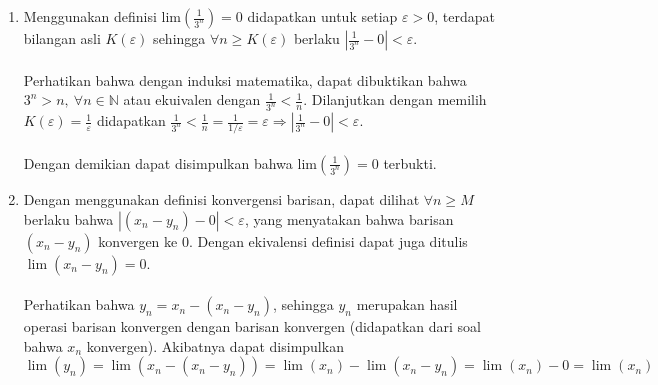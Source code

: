 \documentclass[10pt,openany,a4paper]{article}
\begin{document}
\begin{enumerate}
    \item Menggunakan definisi lim$(\frac{1}{3^n})=0$ didapatkan untuk setiap $\varepsilon>0$, terdapat bilangan asli $K(\varepsilon)$ sehingga $\forall n\geq K(\varepsilon)$ berlaku $|\frac{1}{3^n}-0|<\varepsilon$.\\~\\
    Perhatikan bahwa dengan induksi matematika, dapat dibuktikan bahwa $3^n>n,\:\forall n\in\mathbb{N}$ atau ekuivalen dengan $\frac{1}{3^n}<\frac{1}{n}$. Dilanjutkan dengan memilih $K(\varepsilon)=\frac{1}{\varepsilon}$ didapatkan $\frac{1}{3^{n}}<\frac{1}{n}=\frac{1}{1/\varepsilon}=\varepsilon\Longrightarrow|\frac{1}{3^{n}}-0|<\varepsilon$.\\~\\
    Dengan demikian dapat disimpulkan bahwa lim$(\frac{1}{3^n})=0$ terbukti.
    \vspace{1cm}

    \item Dengan menggunakan definisi konvergensi barisan, dapat dilihat $\forall n\geq M$ berlaku bahwa $|(x_n-y_n)-0|<\varepsilon$, yang menyatakan bahwa barisan $(x_n-y_n)$ konvergen ke 0. Dengan ekivalensi definisi dapat juga ditulis $\lim(x_n-y_n)=0$.\\~\\
    Perhatikan bahwa $y_n=x_n-(x_n-y_n)$, sehingga $y_n$ merupakan hasil operasi barisan konvergen dengan barisan konvergen (didapatkan dari soal bahwa $x_n$ konvergen). Akibatnya dapat disimpulkan 
    \[\lim(y_n)=\lim(x_n-(x_n-y_n))=\lim(x_n)-\lim(x_n-y_n)=\lim(x_n)-0=\lim(x_n)\]
\end{enumerate}
\end{document}
